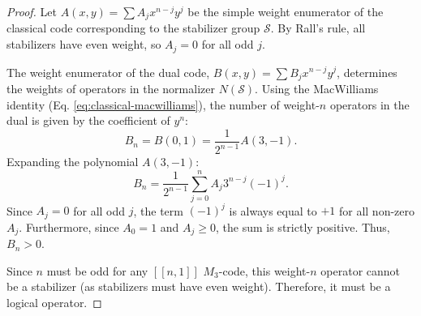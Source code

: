 \documentclass[10pt,a4paper]{amsart}
\begin{document}
\begin{proof}
Let $A(x,y) = \sum A_j x^{n-j}y^j$ be the simple weight enumerator of the classical code corresponding to the stabilizer group $\mathcal{S}$. By Rall's rule, all stabilizers have even weight, so $A_j = 0$ for all odd $j$.

The weight enumerator of the dual code, $B(x,y) = \sum B_j x^{n-j}y^j$, determines the weights of operators in the normalizer $N(\mathcal{S})$. Using the MacWilliams identity (Eq. \eqref{eq:classical-macwilliams}), the number of weight-$n$ operators in the dual is given by the coefficient of $y^n$:
\begin{equation}
    B_n = B(0,1) = \frac{1}{2^{n-1}} A(3, -1).
\end{equation}
Expanding the polynomial $A(3, -1)$:
\begin{equation}
    B_n = \frac{1}{2^{n-1}} \sum_{j=0}^n A_j 3^{n-j} (-1)^j.
\end{equation}
Since $A_j = 0$ for all odd $j$, the term $(-1)^j$ is always equal to $+1$ for all non-zero $A_j$. Furthermore, since $A_0=1$ and $A_j \geq 0$, the sum is strictly positive. Thus, $B_n > 0$.

Since $n$ must be odd for any $[[n,1]]$ $M_3$-code, this weight-$n$ operator cannot be a stabilizer (as stabilizers must have even weight). Therefore, it must be a logical operator.
\end{proof}
\end{document}

